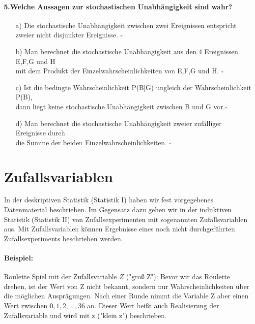 \documentclass[a4paper]{article}
\begin{document}
\paragraph{5.Welche Aussagen zur stochastischen Unabhängigkeit sind wahr?}
\begin{itemize}
    \item[a)]Die stochastische Unabhängigkeit zwischen zwei Ereignissen entspricht \\ zweier nicht disjunkter Ereignisse. \hfill $\square$
    \item[b)]Man berechnet die stochastische Unabhängigkeit aus den 4 Ereignissen E,F,G und H\\ mit dem Produkt der Einzelwahrscheinlichkeiten von E,F,G und H. \hfill $\square$
    \item[c)]Ist die bedingte Wahrscheinlichkeit P(B|G) ungleich der Wahrscheinlichkeit P(B), \\dann liegt keine stochastische Unabhängigkeit zwischen B und G vor.\hfill $\square$
    \item[d)]Man berechnet die stochastische Unabhängigkeit zweier zufälliger Ereignisse durch \\die Summe der beiden Einzelwahrscheinlichkeiten. \hfill $\square$
\end{itemize}


\clearpage


\section{Zufallsvariablen}\label{chap:zv}

In der deskriptiven Statistik (Statistik I) haben wir fest vorgegebenes Datenmaterial beschrieben. Im Gegensatz dazu gehen wir in der induktiven Statistik (Statistik II) von Zufallsexperimenten mit sogenannten Zufallsvariablen aus. Mit Zufallsvariablen können Ergebnisse eines noch nicht durchgeführten Zufallsexperiments beschrieben werden.

\paragraph{Beispiel:} Roulette Spiel mit der Zufallsvariable $Z$ ("groß Z"): Bevor wir das Roulette drehen, ist der Wert von Z nicht bekannt, sondern nur Wahrscheinlichkeiten über die möglichen Ausprägungen. Nach einer Runde nimmt die Variable Z aber einen Wert zwischen $0,1,2,...,36$ an. Dieser Wert heißt auch Realisierung der Zufallsvariable und wird mit z ("klein z") beschrieben.
\end{document}
